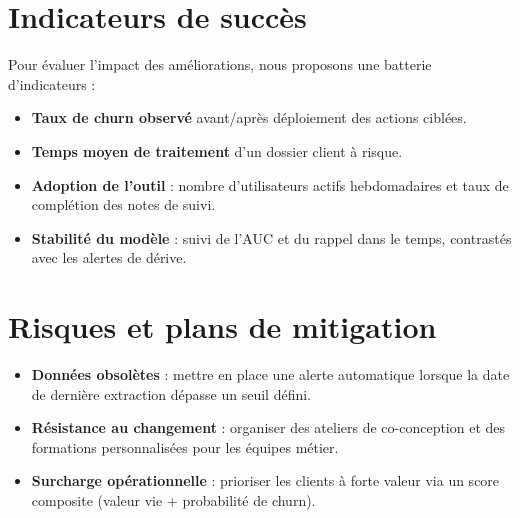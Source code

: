 \section{Indicateurs de succès}
Pour évaluer l'impact des améliorations, nous proposons une batterie d'indicateurs :
\begin{itemize}
    \item \textbf{Taux de churn observé} avant/après déploiement des actions ciblées.
    \item \textbf{Temps moyen de traitement} d'un dossier client à risque.
    \item \textbf{Adoption de l'outil} : nombre d'utilisateurs actifs hebdomadaires et taux de complétion des notes de suivi.
    \item \textbf{Stabilité du modèle} : suivi de l'AUC et du rappel dans le temps, contrastés avec les alertes de dérive.
\end{itemize}

\section{Risques et plans de mitigation}
\begin{itemize}
    \item \textbf{Données obsolètes} : mettre en place une alerte automatique lorsque la date de dernière extraction dépasse un seuil défini.
    \item \textbf{Résistance au changement} : organiser des ateliers de co-conception et des formations personnalisées pour les équipes métier.
    \item \textbf{Surcharge opérationnelle} : prioriser les clients à forte valeur via un score composite (valeur vie + probabilité de churn).
\end{itemize}
